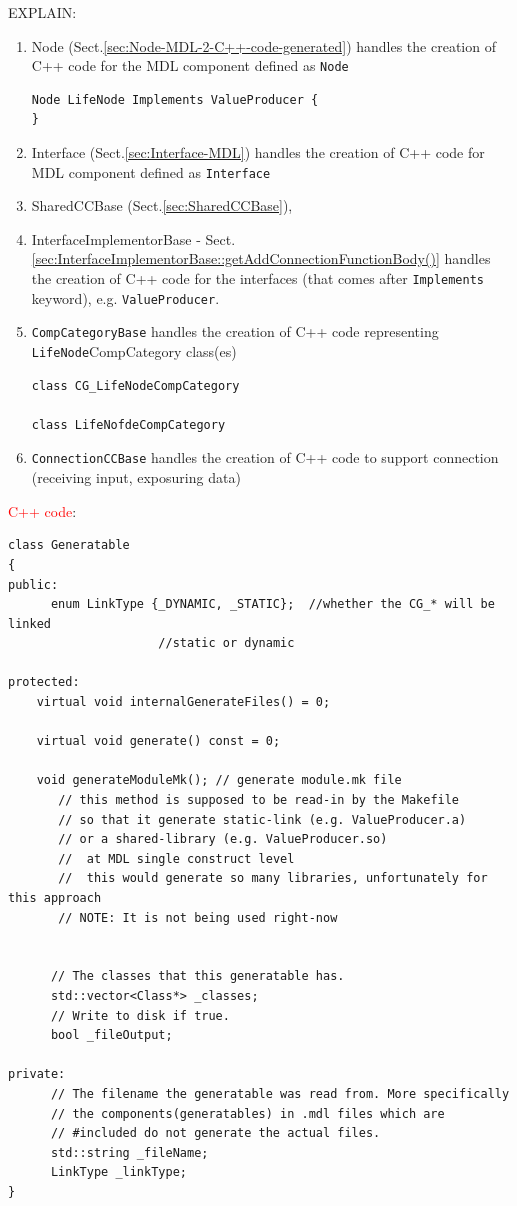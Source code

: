 EXPLAIN:
\begin{enumerate}
  \item Node (Sect.\ref{sec:Node-MDL-2-C++-code-generated}) handles the creation of C++ code for the MDL component defined as \verb!Node!
  
\begin{verbatim}
Node LifeNode Implements ValueProducer {
}
\end{verbatim}
  
  \item Interface (Sect.\ref{sec:Interface-MDL})  handles the creation of C++ code for MDL component defined as \verb!Interface!
  
  
  
  \item SharedCCBase (Sect.\ref{sec:SharedCCBase}), 

  \item InterfaceImplementorBase -
  Sect.\ref{sec:InterfaceImplementorBase::getAddConnectionFunctionBody()}
  handles the creation of C++ code for the interfaces (that comes after
  \verb!Implements! keyword), e.g. \verb!ValueProducer!.
  
  \item \verb!CompCategoryBase! handles the creation of C++ code representing \verb!LifeNode!CompCategory class(es)

\begin{verbatim}
class CG_LifeNodeCompCategory

class LifeNofdeCompCategory
\end{verbatim}
  
  \item \verb!ConnectionCCBase! handles the creation of C++ code to support connection (receiving input, exposuring data)
\end{enumerate}

\textcolor{red}{C++ code}: 
\begin{verbatim}
class Generatable
{
public:
      enum LinkType {_DYNAMIC, _STATIC};  //whether the CG_* will be linked
                     //static or dynamic

protected:
	virtual void internalGenerateFiles() = 0;
	
	virtual void generate() const = 0;
	
	void generateModuleMk(); // generate module.mk file
	   // this method is supposed to be read-in by the Makefile
	   // so that it generate static-link (e.g. ValueProducer.a)
	   // or a shared-library (e.g. ValueProducer.so)
	   //  at MDL single construct level
	   //  this would generate so many libraries, unfortunately for this approach
	   // NOTE: It is not being used right-now


      // The classes that this generatable has.
      std::vector<Class*> _classes;
      // Write to disk if true.
      bool _fileOutput;

private:
      // The filename the generatable was read from. More specifically
      // the components(generatables) in .mdl files which are 
      // #included do not generate the actual files.
      std::string _fileName; 
      LinkType _linkType;
}
\end{verbatim}

